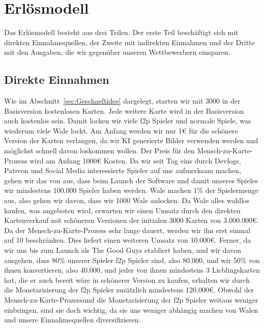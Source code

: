 \documentclass[fontsize=11, a4aper]{scrartcl}
\begin{document}
\section{Erlösmodell} \label{sec:Erloesmodell}

Das Erlösmodell besteht aus drei Teilen. Der erste Teil beschäftigt sich mit direkten Einnahmequellen, der Zweite mit indirekten Einnahmen und der Dritte mit den Ausgaben, die wir gegenüber unseren Wettbewerbern einsparen.

\subsection{Direkte Einnahmen} \label{subsec:Direkte_Einnahmen}

Wie im Abschnitt~\ref{sec:Geschaeftidee} dargelegt, starten wir mit 3000 in der Basisversion kostenlosen Karten. Jede weitere Karte wird in der Basisversion auch kostenlos sein. Damit locken wir viele \acl{f2p} Spieler und normale Spiele, was wiederum viele Wale lockt. Am Anfang werden wir nur 1€ für die schönere Version der Karten verlangen, da wir KI generierte Bilder verwenden werden und möglichst schnell davon loskommen wollen. Der Preis für den \glqq Mensch-zu-Karte-Prozess\grqq{} wird am Anfang 1000€ Kosten. Da wir seit Tag eins durch Devlogs, Patreon und Social Media interessierte Spieler auf uns aufmerksam machen, gehen wir das von aus, dass beim Launch der Software und damit unseres Spieles wir mindestens 100.000 Spieler haben werden. Wale machen 1\% der Spielermenge aus, also gehen wir davon, dass wir 1000 Wale anlocken. Da Wale alles wahllos kaufen, was angeboten wird, erwarten wir einen Umsatz durch den direkten Kartenverkauf mit schöneren Versionen der initialen 3000 Karten von 3.000.000€. Da der \glqq Mensch-zu-Karte-Prozess\grqq{} sehr lange dauert, werden wir ihn erst einmal auf 10 beschränken. Dies liefert einen weiteren Umsatz von 10.000€. Ferner, da wir uns bis zum Launch als \glqq The Good Guys\grqq{} etabliert haben, und wir davon ausgehen, dass 80\% unserer Spieler \acl{f2p} Spieler sind, also 80.000, und wir 50\% von ihnen konvertieren, also 40.000, und jeder von ihnen mindestens 3 Lieblingskarten hat, die er auch bereit wäre in schönerer Version zu kaufen, erhalten wir durch die Monetarisierung der \ac{f2p} Spieler zusätzlich mindestens 120.000€. Obwohl der \glqq Mensch-zu-Karte-Prozess\grqq und die Monetarisierung der \ac{f2p} Spieler weitaus weniger einbringen, sind sie doch wichtig, da sie uns weniger abhängig machen von Walen und unsere Einnahmequellen diversifizieren.\hfill\newline
\end{document}
